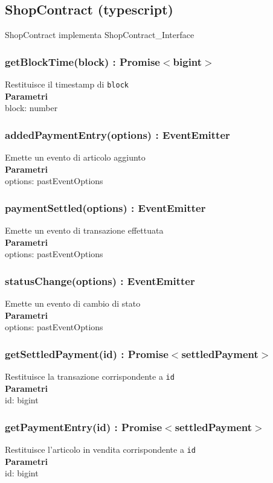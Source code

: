 \documentclass[a4paper, 12pt]{article}
\begin{document}
\subsection{ShopContract (typescript)}
ShopContract implementa ShopContract\_Interface
\subsubsection{getBlockTime(block) : Promise$<$bigint$>$}
Restituisce il timestamp di \texttt{block}\\
\textbf{Parametri}\\
block: number\\
\subsubsection{addedPaymentEntry(options) : EventEmitter}
Emette un evento di articolo aggiunto\\
\textbf{Parametri}\\
options: pastEventOptions
\subsubsection{paymentSettled(options) : EventEmitter}
Emette un evento di transazione effettuata\\
\textbf{Parametri}\\
options: pastEventOptions
\subsubsection{statusChange(options) : EventEmitter}
Emette un evento di cambio di stato\\
\textbf{Parametri}\\
options: pastEventOptions
\subsubsection{getSettledPayment(id) : Promise$<$settledPayment$>$}
Restituisce la transazione corrispondente a \texttt{id}\\
\textbf{Parametri}\\
id: bigint
\subsubsection{getPaymentEntry(id) : Promise$<$settledPayment$>$}
Restituisce l'articolo in vendita corrispondente a \texttt{id}\\
\textbf{Parametri}\\
id: bigint
\end{document}
